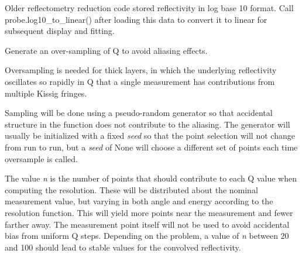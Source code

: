 \documentclass[letterpaper,10pt,english]{sphinxmanual}
\begin{document}
\begin{fulllineitems}
\begin{fulllineitems}
Older reflectometry reduction code stored reflectivity in log base 10
format.  Call probe.log10\_to\_linear() after loading this data to
convert it to linear for subsequent display and fitting.

\end{fulllineitems}


\begin{fulllineitems}
\label{api/probe:refl1d.probe.QProbe.name}
\end{fulllineitems}


\begin{fulllineitems}
\label{api/probe:refl1d.probe.QProbe.oversample}
Generate an over-sampling of Q to avoid aliasing effects.

Oversampling is needed for thick layers, in which the underlying
reflectivity oscillates so rapidly in Q that a single measurement
has contributions from multiple Kissig fringes.

Sampling will be done using a pseudo-random generator so that
accidental structure in the function does not contribute to the
aliasing.  The generator will usually be initialized with a fixed
\emph{seed} so that the point selection will not change from run to run,
but a \emph{seed} of None will choose a different set of points each time
oversample is called.

The value \emph{n} is the number of points that should contribute to
each Q value when computing the resolution.   These will be
distributed about the nominal measurement value, but varying in
both angle and energy according to the resolution function.  This
will yield more points near the measurement and fewer farther away.
The measurement point itself will not be used to avoid accidental
bias from uniform Q steps.  Depending on the problem, a value of
\emph{n} between 20 and 100 should lead to stable values for the convolved
reflectivity.

\end{fulllineitems}


\begin{fulllineitems}
\label{api/probe:refl1d.probe.QProbe.parameters}
\end{fulllineitems}


\end{fulllineitems}
\end{document}
